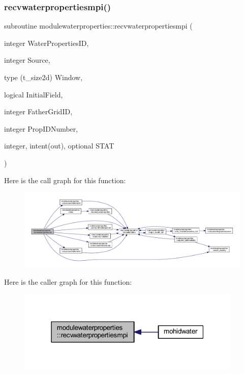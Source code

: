 \subsubsection{\texorpdfstring{recvwaterpropertiesmpi()}{recvwaterpropertiesmpi()}}
{\footnotesize\ttfamily subroutine modulewaterproperties\+::recvwaterpropertiesmpi (\begin{DoxyParamCaption}\item[{integer}]{Water\+Properties\+ID,  }\item[{integer}]{Source,  }\item[{type (t\+\_\+size2d)}]{Window,  }\item[{logical}]{Initial\+Field,  }\item[{integer}]{Father\+Grid\+ID,  }\item[{integer}]{Prop\+I\+D\+Number,  }\item[{integer, intent(out), optional}]{S\+T\+AT }\end{DoxyParamCaption})\hspace{0.3cm}{\ttfamily [private]}}

Here is the call graph for this function\+:\nopagebreak
\begin{figure}[H]
\begin{center}
\leavevmode
\includegraphics[width=350pt]{namespacemodulewaterproperties_ae6984c00ccf20f1bc66a14e9e9466c38_cgraph}
\end{center}
\end{figure}
Here is the caller graph for this function\+:\nopagebreak
\begin{figure}[H]
\begin{center}
\leavevmode
\includegraphics[width=304pt]{namespacemodulewaterproperties_ae6984c00ccf20f1bc66a14e9e9466c38_icgraph}
\end{center}
\end{figure}
\mbox{\label{namespacemodulewaterproperties_a3b050fab4946fe3d8840f4104a85e0ab}} 
